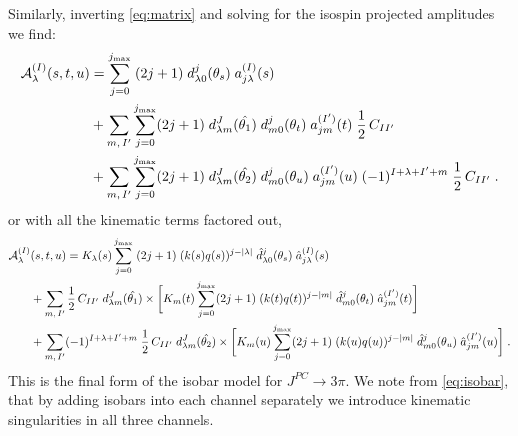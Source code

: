 Similarly, inverting \cref{eq:matrix} and solving for the isospin projected amplitudes we find:
  \begin{align}
    \mathcal{A}^{(I)}_\lambda(s,t,u) &=
    \sum_{j = 0}^{j_\text{max}} \; (2j + 1) \; d_{\lambda 0}^j(\theta_s) \; a_{j \lambda}^{(I)}(s) \nonumber \\
    &+ \sum_{m, \, {I^\prime}} \sum_{j = 0}^{j_\text{max}} (2j + 1) \; d_{\lambda m}^J(\hat{\theta_1}) \;  d_{m 0}^j(\theta_t) \; a_{j m}^{({I^\prime})}(t) \; \frac{1}{2} \, C_{I{I^\prime}} \\
    &+ \sum_{m, \, {I^\prime}} \sum_{j = 0}^{j_\text{max}} (2j + 1) \; d_{\lambda m}^J(\hat{\theta_2}) \;  d_{m 0}^j(\theta_u) \;
     a_{j m}^{({I^\prime})}(u) \; (-1)^{I + \lambda + {I^\prime}+  m} \; \frac{1}{2} \, C_{I{I^\prime}} \; . \nonumber
  \end{align}
or with all the kinematic terms factored out,
\begin{align}
  \label{eq:isobar}
  \mathcal{A}^{(I)}_\lambda&(s,t,u) =
   K_{\lambda}(s)
  \sum_{j = 0}^{j_\text{max}} \; (2j + 1) \;  (k(s)q(s))^{j - |\lambda|} \;
   \hat{d}_{\lambda 0}^j(\theta_s) \; \hat{a}_{j \lambda}^{(I)}(s) \nonumber \\
  &+ \sum_{m, \, {I^\prime}} \frac{1}{2} \, C_{I{I^\prime}} \;  d_{\lambda m}^J(\hat{\theta_1}) \times
  \bigg [  K_{m}(t) \sum_{j = 0}^{j_\text{max}} (2j + 1) \;
  (k(t)q(t))^{j - |m|} \;\hat{d}_{m 0}^j(\theta_t) \; \hat{a}_{j m}^{({I^\prime})}(t) \bigg]  \\
  &+ \sum_{m, \, {I^\prime}} (-1)^{I + \lambda + {I^\prime} + m} \; \frac{1}{2} \, C_{I{I^\prime}} \;  d_{\lambda m}^J(\hat{\theta_2}) \times
  \bigg [ K_{m}(u) \sum_{j = 0}^{j_\text{max}} (2j + 1) \;
  (k(u)q(u))^{j - |m|} \; \hat{d}_{m 0}^j(\theta_u) \; \hat{a}_{j m}^{({I^\prime})}(u) \bigg] \;. \nonumber
\end{align}
This is the final form of the isobar model for \(J^{PC} \to 3\pi\). We note from \cref{eq:isobar}, that by adding isobars into each channel separately we introduce kinematic singularities in all three channels.
